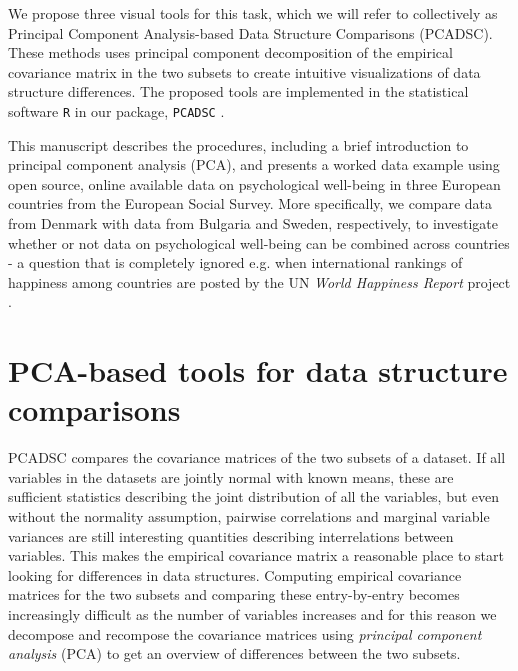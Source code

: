 \documentclass[a4paper,14pt]{article}
\begin{document}
We propose three visual tools for this task, which we will refer to collectively as Principal Component Analysis-based Data Structure Comparisons (PCADSC). These methods uses principal component decomposition of the empirical covariance matrix in the two subsets to create intuitive visualizations of data structure differences. The proposed tools are implemented in the statistical software \texttt{R} in our package, \texttt{PCADSC} \cite{PCADSC}.

This manuscript describes the procedures, including a brief introduction to principal component analysis (PCA), and presents a worked data example using open source, online available data on psychological well-being in three European countries from the European Social Survey. More specifically, we compare data from Denmark with data from Bulgaria and Sweden, respectively, to investigate whether or not data on psychological well-being can be combined across countries - a question that is completely ignored e.g. when international rankings of happiness among countries are posted by the UN \textit{World Happiness Report} project \cite{WHR2016}.


\section*{PCA-based tools for data structure comparisons}\label{sec:pcadscintro}


PCADSC compares the covariance matrices of the two subsets of a dataset. If all variables in the datasets are jointly normal with known means, these are sufficient statistics describing the joint distribution of all the variables, but even without the normality assumption, pairwise correlations and marginal variable variances are still interesting quantities describing interrelations between variables. This makes the empirical covariance matrix a reasonable place to start looking for differences in data structures. Computing empirical covariance matrices for the two subsets and comparing these entry-by-entry becomes increasingly difficult as the number of variables increases and for this reason we decompose and recompose the covariance matrices using \textit{principal component analysis} (PCA) to get an overview of differences between the two subsets.
\end{document}
